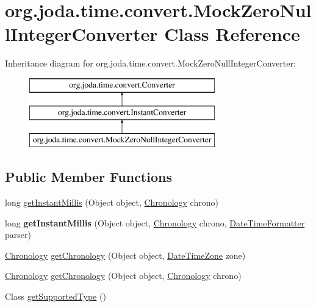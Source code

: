 \hypertarget{classorg_1_1joda_1_1time_1_1convert_1_1_mock_zero_null_integer_converter}{\section{org.\-joda.\-time.\-convert.\-Mock\-Zero\-Null\-Integer\-Converter Class Reference}
\label{classorg_1_1joda_1_1time_1_1convert_1_1_mock_zero_null_integer_converter}
}
Inheritance diagram for org.\-joda.\-time.\-convert.\-Mock\-Zero\-Null\-Integer\-Converter\-:\begin{figure}[H]
\begin{center}
\leavevmode
\includegraphics[height=3.000000cm]{classorg_1_1joda_1_1time_1_1convert_1_1_mock_zero_null_integer_converter}
\end{center}
\end{figure}
\subsection*{Public Member Functions}
\begin{DoxyCompactItemize}
\item 
long \hyperlink{classorg_1_1joda_1_1time_1_1convert_1_1_mock_zero_null_integer_converter_a29968f84717b1204d922e22e0ab4f590}{get\-Instant\-Millis} (Object object, \hyperlink{classorg_1_1joda_1_1time_1_1_chronology}{Chronology} chrono)
\item 
\hypertarget{classorg_1_1joda_1_1time_1_1convert_1_1_mock_zero_null_integer_converter_a05f16a441f1347627ffb9e1bb950e461}{long {\bfseries get\-Instant\-Millis} (Object object, \hyperlink{classorg_1_1joda_1_1time_1_1_chronology}{Chronology} chrono, \hyperlink{classorg_1_1joda_1_1time_1_1format_1_1_date_time_formatter}{Date\-Time\-Formatter} parser)}\label{classorg_1_1joda_1_1time_1_1convert_1_1_mock_zero_null_integer_converter_a05f16a441f1347627ffb9e1bb950e461}

\item 
\hyperlink{classorg_1_1joda_1_1time_1_1_chronology}{Chronology} \hyperlink{classorg_1_1joda_1_1time_1_1convert_1_1_mock_zero_null_integer_converter_af72a2c4d096e35af400ceaf0acf8cf22}{get\-Chronology} (Object object, \hyperlink{classorg_1_1joda_1_1time_1_1_date_time_zone}{Date\-Time\-Zone} zone)
\item 
\hyperlink{classorg_1_1joda_1_1time_1_1_chronology}{Chronology} \hyperlink{classorg_1_1joda_1_1time_1_1convert_1_1_mock_zero_null_integer_converter_a963888d116a9087f89e11d124a466a2e}{get\-Chronology} (Object object, \hyperlink{classorg_1_1joda_1_1time_1_1_chronology}{Chronology} chrono)
\item 
Class \hyperlink{classorg_1_1joda_1_1time_1_1convert_1_1_mock_zero_null_integer_converter_afc2074398d90a7e5d661ef708c1a7e55}{get\-Supported\-Type} ()
\end{DoxyCompactItemize}
